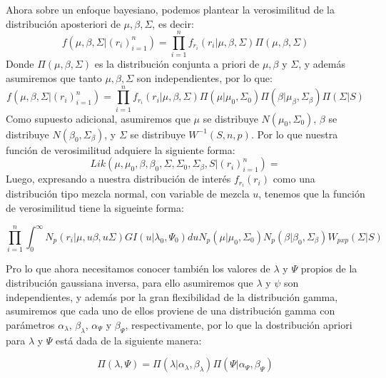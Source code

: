 \documentclass[11pt]{book}
\begin{document}
Ahora sobre un enfoque bayesiano, podemos plantear la verosimilitud de la distribución aposteriori de $\mu,\beta,\Sigma$, es decir:
\begin{equation*}
f(\mu,\beta,\Sigma|(r_{i})_{i=1}^{n})=\prod_{i=1}^{n}f_{r_{i}}(r_{i}|\mu,\beta,\Sigma)\Pi(\mu,\beta,\Sigma)
\end{equation*}   
Donde $\Pi(\mu,\beta,\Sigma)$ es la distribución conjunta a priori de $\mu,\beta$ y $\Sigma$, y además asumiremos que tanto $\mu,\beta,\Sigma$ son independientes, por lo que:
\begin{equation*}
f(\mu,\beta,\Sigma|(r_{i})_{i=1}^{n})=\prod_{i=1}^{n}f_{r_{i}}(r_{i}|\mu,\beta,\Sigma)\Pi(\mu|\mu_{0},\Sigma_{0})\Pi(\beta|\mu_{\beta},\Sigma_{\beta})\Pi(\Sigma|S)
\end{equation*}
 Como supuesto adicional, asumiremos que $\mu$ se distribuye $N(\mu_{0},\Sigma_{0})$, $\beta$ se distribuye $N(\beta_{0},\Sigma_{\beta})$, y $\Sigma$ se distribuye $W^{-1}(S,n,p)$. Por lo que nuestra función de verosimilitud adquiere la siguiente forma:
\begin{equation*}
Lik(\mu,\mu_{0},\beta,\beta_{0},\Sigma,\Sigma_{0},\Sigma_{\beta},S|(r_{i})_{i=1}^{n})=
\end{equation*}
Luego, expresando a nuestra distribución de interés $f_{r_{i}}(r_{i})$ como una distribución tipo mezcla normal, con variable de mezcla $u$, tenemos que la función de verosimilitud tiene la sigueinte forma:
 
\begin{equation*}
\prod_{i=1}^{n}\int_{0}^{\infty}N_{p}(r_{i}|\mu,u\beta,u\Sigma)GI(u|\lambda_{0},\Psi_{0})du N_{p}(\mu|\mu_{0},\Sigma_{0})N_{p}(\beta|\beta_{0},\Sigma_{\beta})W_{pxp}(\Sigma|S)
\end{equation*}

Pro lo que ahora necesitamos conocer también los valores de $\lambda$ y $\Psi$ propios de la distribución gaussiana inversa, para ello asumiremos que $\lambda$ y $\psi$ son independientes, y además por la gran flexibilidad de la distribución gamma, asumiremos que cada uno de ellos proviene de una distribución gamma con parámetros $\alpha_{\lambda}$, $\beta_{\lambda}$, $\alpha_{\Psi}$ y $\beta_{\Psi}$, respectivamente, por lo que la dostribución apriori para $\lambda$ y $\Psi$ está dada de la siguiente manera:

\begin{equation*}
\Pi(\lambda,\Psi)=\Pi(\lambda|\alpha_{\lambda},\beta_{\lambda})\Pi(\Psi|\alpha_{\Psi},\beta_{\Psi})
\end{equation*}
\end{document}
